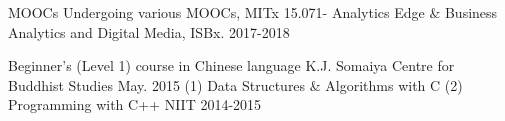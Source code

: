 









\begin{cvhonors}

\cvhonor
{MOOCs} %
{Undergoing various MOOCs, MITx 15.071- Analytics Edge \& Business Analytics and Digital Media, ISBx.} %
{ } %
{2017-2018} %



\cvhonor
{Beginner's (Level 1) course in Chinese language} %
{K.J. Somaiya Centre for Buddhist Studies} %
{ } %
{May. 2015} %
\cvhonor
{(1) Data Structures \& Algorithms with C (2) Programming with C++} %
{NIIT} %
{ } %
{2014-2015} %








\end{cvhonors}
\vspace{-0.5\baselineskip} 